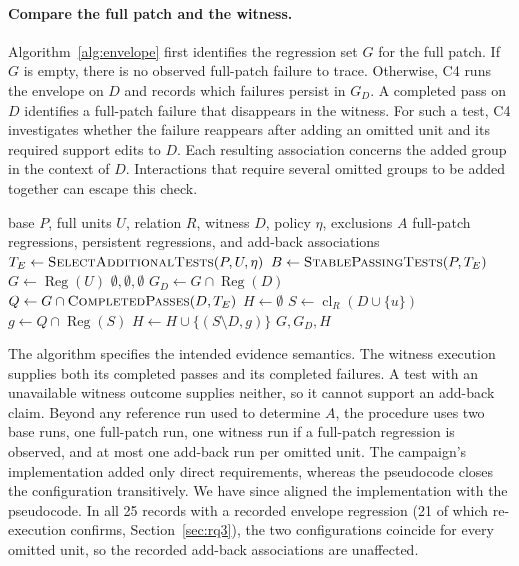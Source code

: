 \documentclass[a4paper,fleqn]{cas-sc}
\newcommand{\cl}{\operatorname{cl}}
\begin{document}
\paragraph{Compare the full patch and the witness.} Algorithm~\ref{alg:envelope} first identifies the regression set $G$ for the full patch. If $G$ is empty, there is no observed full-patch failure to trace. Otherwise, C4 runs the envelope on $D$ and records which failures persist in $G_D$. A completed pass on $D$ identifies a full-patch failure that disappears in the witness. For such a test, C4 investigates whether the failure reappears after adding an omitted unit and its required support edits to $D$. Each resulting association concerns the added group in the context of $D$. Interactions that require several omitted groups to be added together can escape this check.

\begin{algorithm}[tbp]
\caption{Envelope observations and add-back witnesses (C4)}\label{alg:envelope}
\begin{algorithmic}[1]
\Require base $P$, full units $U$, relation $R$, witness $D$, policy $\eta$, exclusions $A$
\Ensure full-patch regressions, persistent regressions, and add-back associations
\State $T_E\gets\Call{SelectAdditionalTests}{P,U,\eta}$
\State $B\gets\Call{StablePassingTests}{P,T_E}$
\State $G\gets\operatorname{Reg}(U)$ 
 \State \Return $\emptyset,\emptyset,\emptyset$ \EndIf
\State $G_D\gets G\cap\operatorname{Reg}(D)$
\State $Q\gets G\cap\Call{CompletedPasses}{D,T_E}$
\State $H\gets\emptyset$
  \State $S\gets\cl_R(D\cup\{u\})$
  \State $g\gets Q\cap\operatorname{Reg}(S)$
   \State $H\gets H\cup\{(S\setminus D,g)\}$ \EndIf
\EndFor
\State \Return $G,G_D,H$
\end{algorithmic}
\end{algorithm}

The algorithm specifies the intended evidence semantics. The witness execution supplies both its completed passes and its completed failures. A test with an unavailable witness outcome supplies neither, so it cannot support an add-back claim. Beyond any reference run used to determine $A$, the procedure uses two base runs, one full-patch run, one witness run if a full-patch regression is observed, and at most one add-back run per omitted unit. The campaign's implementation added only direct requirements, whereas the pseudocode closes the configuration transitively. We have since aligned the implementation with the pseudocode. In all 25 records with a recorded envelope regression (21 of which re-execution confirms, Section~\ref{sec:rq3}), the two configurations coincide for every omitted unit, so the recorded add-back associations are unaffected.
\end{document}
